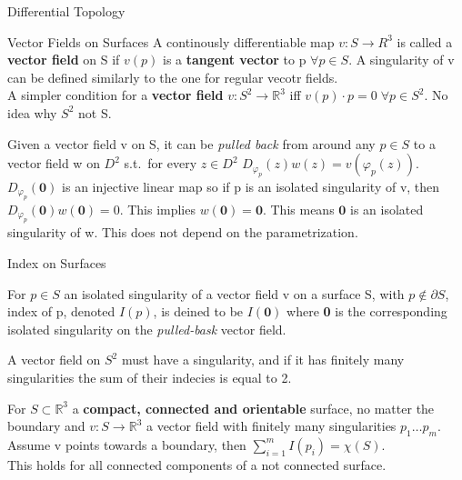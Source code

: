 \documentclass[12pt, letterpaper]{article}
\begin{document}
\begin{section}{Differential Topology}
\begin{subsection}{Vector Fields on Surfaces}
    A continously differentiable map \(v: S \to R^{3}\) is called a \textbf{vector field}
    on S if \(v(p)\) is a \textbf{tangent vector} to p \(\forall p \in S\). A
    singularity of v can be defined similarly to the one for regular vecotr fields. \\
    A simpler condition for a \textbf{vector field} \(v: S^{2} \to \mathbb{R}^{3}\)
    iff \(v(p) \cdot p = 0 \; \forall p \in S^{2}\). No idea why \(S^{2}\) not S.

    Given a vector field v on S, it can be \textit{pulled back} from around any
    \(p \in S\) to a vector field w on \(D^{2}\) s.t.\ for every \(z \in D^{2}\)
    \(D_{\varphi_{p}}(z)w(z) = v(\varphi_{p}(z))\). \\
    \(D_{\varphi_{p}}(\textbf{0})\) is an injective linear map so if p is an
    isolated singularity of v, then \(D_{\varphi_{p}}(\textbf{0})w(\textbf{0}) = 0\).
    This implies \(w(\textbf{0}) = \textbf{0}\). This means \(\textbf{0}\) is an
    isolated singularity of w. This does not depend on the parametrization.


  \end{subsection}

  \begin{subsection}{Index on Surfaces}

    For \(p \in S\) an isolated singularity of a vector field v on a surface
    S, with \(p \notin \partial S\), index of p, denoted \(I(p)\), is deined to be
    \(I(\textbf{0})\) where \textbf{0} is the corresponding isolated singularity
    on the \textit{pulled-bask} vector field.

    A vector field on \(S^{2}\) must have a singularity, and if it has finitely
    many singularities the sum of their indecies is equal to 2.

    For \(S \subset \mathbb{R}^{3}\) a \textbf{compact, connected and orientable}
    surface, no matter the boundary and \(v: S \to \mathbb{R}^{3}\) a vector
    field with finitely many singularities \(p_{1} \dots p_{m}\). Assume v points
    towards a boundary, then \(\sum^{m}_{i = 1} I(p_{i}) = \chi(S)\). \\
    This holds for all connected components of a not connected surface.

  \end{subsection}

\end{section}
\end{document}
